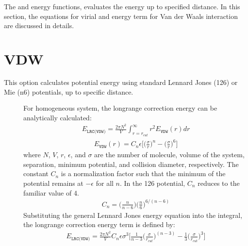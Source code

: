 \documentclass[letterpaper,10pt,english]{sphinxmanual}
\begin{document}
The  and  energy functions, evaluates the energy up to specified  distance. In this section, the  equations for virial and energy term
for Van der Waals interaction are discussed in details.


\section{VDW}
\label{\detokenize{long_range_correction:vdw}}
This option calculates potential energy using standard Lennard Jones (12\sphinxhyphen{}6) or Mie (n\sphinxhyphen{}6) potentials, up to specific  distance.
\begin{description}
\item[{}] \leavevmode
For homogeneous system, the long\sphinxhyphen{}range correction energy can be analytically calculated:
\begin{equation*}
\begin{split}E_{\texttt{LRC(VDW)}} = \frac{2\pi N^2}{V} \int_{r=r_{cut}}^{\infty} r^2 E_{\texttt{VDW}}(r) dr\end{split}
\end{equation*}\begin{equation*}
\begin{split}E_{\texttt{VDW}}(r) = C_{n} \epsilon \bigg[\bigg(\frac{\sigma}{r}\bigg)^{n} - \bigg(\frac{\sigma}{r}\bigg)^6\bigg]\end{split}
\end{equation*}
where \(N\), \(V\), \(r\), \(\epsilon\), and \(\sigma\) are the number of molecule, volume of the system, separation, minimum potential, and collision diameter, respectively.
The constant \(C_n\) is a normalization factor such that the minimum of the potential remains at \(-\epsilon\) for all \(n\). In the 12\sphinxhyphen{}6 potential, \(C_n\) reduces to the familiar value of 4.
\begin{equation*}
\begin{split}C_{n} = \bigg(\frac{n}{n - 6} \bigg)\bigg(\frac{n}{6} \bigg)^{6/(n - 6)}\end{split}
\end{equation*}
Substituting the general Lennard Jones energy equation into the integral, the long\sphinxhyphen{}range correction energy term is defined by:
\begin{equation*}
\begin{split}E_{\texttt{LRC(VDW)}} = \frac{2\pi N^2}{V} C_{n} \epsilon {\sigma}^3 \bigg[\frac{1}{n-3}\bigg(\frac{\sigma}{r_{cut}}\bigg)^{(n-3)} - \frac{1}{3} \bigg(\frac{\sigma}{r_{cut}}\bigg)^3\bigg]\end{split}

\end{equation*}
\end{description}
\end{document}
